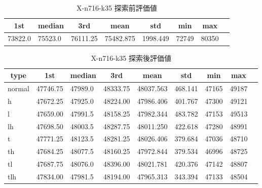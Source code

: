 \begin{table}[htbp]
    \caption{X-n716-k35 探索前評価値}
    \begin{tabular}{|l|l|l|l|l|l|l|l|}\hline
    \multicolumn{1}{|c|}{\textbf{1st}}
    &\multicolumn{1}{c|}{\textbf{median}}
    &\multicolumn{1}{c|}{\textbf{3rd}}
    &\multicolumn{1}{c|}{\textbf{mean}}
    &\multicolumn{1}{c|}{\textbf{std}}
    &\multicolumn{1}{c|}{\textbf{min}}
    &\multicolumn{1}{c|}{\textbf{max}}\\\hline
	73822.0 & 75523.0 & 76111.25 & 75482.875 & 1998.449 & 72749 & 80350\\\hline
	\end{tabular}
\end{table}
\begin{table}[htbp]
    \caption{X-n716-k35 探索後評価値}
    \begin{tabular}{|l|l|l|l|l|l|l|l|l|}\hline
    \multicolumn{1}{|c|}{\textbf{type}}
    &\multicolumn{1}{|c|}{\textbf{1st}}
    &\multicolumn{1}{c|}{\textbf{median}}
    &\multicolumn{1}{c|}{\textbf{3rd}}
    &\multicolumn{1}{c|}{\textbf{mean}}
    &\multicolumn{1}{c|}{\textbf{std}}
    &\multicolumn{1}{c|}{\textbf{min}}
    &\multicolumn{1}{c|}{\textbf{max}}\\\hline
	normal & 47746.75 & 47989.0 & 48333.75 & 48037.563 & 468.141 & 47165 & 49187\\\hline
	h & 47672.25 & 47925.0 & 48224.00 & 47986.406 & 401.767 & 47300 & 49121\\\hline
	l & 47659.00 & 47991.5 & 48158.25 & 47982.344 & 483.782 & 47153 & 49513\\\hline
	lh & 47698.50 & 48003.5 & 48287.75 & 48011.250 & 422.618 & 47280 & 48991\\\hline
	t & 47771.25 & 48123.5 & 48281.25 & 48026.406 & 379.684 & 47036 & 48710\\\hline
	th & 47684.25 & 48077.5 & 48160.25 & 47972.844 & 379.534 & 46996 & 48725\\\hline
	tl & 47687.75 & 48076.0 & 48396.00 & 48021.781 & 420.376 & 47142 & 48807\\\hline
	tlh & 47834.00 & 47981.5 & 48194.00 & 47965.313 & 343.394 & 47133 & 48504\\\hline
	\end{tabular}
\end{table}

